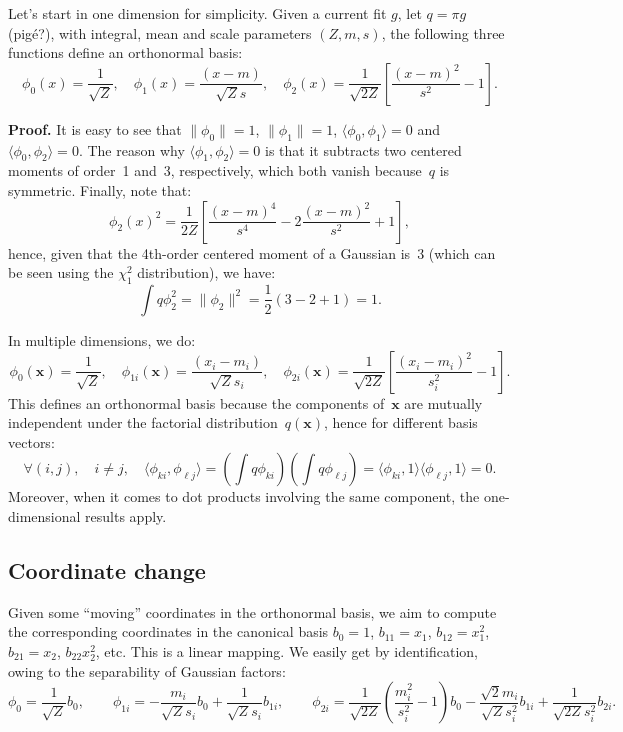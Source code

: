\documentclass{article}
\def\x{\mathbf{x}}
\begin{document}
Let's start in one dimension for simplicity. Given a current fit $g$, let $q=\pi g$ (pig\'e?),  with integral, mean and scale parameters $(Z, m, s)$, the following three functions define an orthonormal basis:
$$
\phi_0(x) = \frac{1}{\sqrt{Z}},
\quad \phi_1(x) = \frac{(x-m)}{\sqrt{Z}s},
\quad \phi_2(x) = \frac{1}{\sqrt{2Z}}\left[\frac{(x-m)^2}{s^2} - 1\right].
$$

{\bf Proof.} It is easy to see that $\|\phi_0\|=1$, $\|\phi_1\|=1$, $\langle \phi_0, \phi_1 \rangle=0$ and $\langle \phi_0, \phi_2 \rangle=0$. The reason why $\langle \phi_1, \phi_2 \rangle=0$ is that it subtracts two centered moments of order~1 and~3, respectively, which both vanish because~$q$ is symmetric. Finally, note that:
$$
\phi_2(x)^2 = \frac{1}{2Z} 
\left[\frac{(x-m)^4}{s^4} - 2 \frac{(x-m)^2}{s^2} + 1 \right],
$$
hence, given that the 4th-order centered moment of a Gaussian is~3 (which can be seen using the $\chi_1^2$ distribution), we have:
$$
\int q \phi_2^2 = \|\phi_2\|^2 = \frac{1}{2} (3 - 2 + 1) = 1.
$$

In multiple dimensions, we do:
$$
\phi_0(\x) = \frac{1}{\sqrt{Z}}, 
\quad
\phi_{1i}(\x) = \frac{(x_i-m_i)}{\sqrt{Z} s_i},
\quad
\phi_{2i}(\x) = \frac{1}{\sqrt{2Z}}\left[\frac{(x_i-m_i)^2}{s_i^2} - 1\right].
$$
This defines an orthonormal basis because the components of~$\x$ are mutually independent under the factorial distribution~$q(\x)$, hence for different basis vectors: 
$$
\forall (i,j), \quad i\not= j, \quad
\langle \phi_{ki}, \phi_{\ell j} \rangle
= \left(\int q \phi_{ki}\right)\left(\int q \phi_{\ell j}\right)
= \langle \phi_{ki}, 1 \rangle \langle \phi_{\ell j}, 1 \rangle = 0.
$$
Moreover, when it comes to dot products involving the same component, the one-dimensional results apply.


\subsection{Coordinate change}

Given some ``moving'' coordinates in the orthonormal basis, we aim to compute the corresponding coordinates in the canonical basis $b_0=1$, $b_{11}=x_1$, $b_{12}=x_1^2$, $b_{21}=x_2$, $b_{22}x_2^2$, etc. This is a linear mapping. We easily get by identification, owing to the separability of Gaussian factors:
$$
\phi_0 =
\frac{1}{\sqrt{Z}} b_0,
\qquad
\phi_{1i} =
-\frac{m_i}{\sqrt{Z}s_i} b_0
+ \frac{1}{\sqrt{Z}s_i} b_{1i},
\qquad
\phi_{2i} =
\frac{1}{\sqrt{2Z}} \left(\frac{m_i^2}{s_i^2} - 1\right) b_0
- \frac{\sqrt{2}m_i}{\sqrt{Z}s_i^2} b_{1i}
+ \frac{1}{\sqrt{2Z}s_i^2} b_{2i}.
$$
\end{document}
